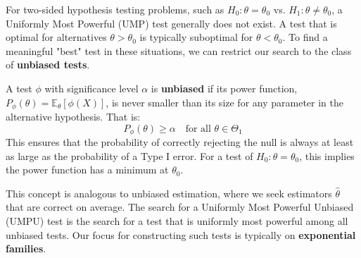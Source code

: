 For two-sided hypothesis testing problems, such as $H_0: \theta = \theta_0$ vs. $H_1: \theta \neq \theta_0$, a Uniformly Most Powerful (UMP) test generally does not exist. A test that is optimal for alternatives $\theta > \theta_0$ is typically suboptimal for $\theta < \theta_0$. To find a meaningful "best" test in these situations, we can restrict our search to the class of \textbf{unbiased tests}.

\begin{de}
A test $\phi$ with significance level $\alpha$ is \textbf{unbiased} if its power function, $P_{\phi}(\theta) = \mathbb{E}_{\theta}[\phi(X)]$, is never smaller than its size for any parameter in the alternative hypothesis. That is:
$$
P_{\phi}(\theta) \ge \alpha \quad \text{for all } \theta \in \Theta_1
$$
This ensures that the probability of correctly rejecting the null is always at least as large as the probability of a Type I error. For a test of $H_0: \theta = \theta_0$, this implies the power function has a minimum at $\theta_0$.
\end{de}

This concept is analogous to unbiased estimation, where we seek estimators $\hat{\theta}$ that are correct on average. The search for a Uniformly Most Powerful Unbiased (UMPU) test is the search for a test that is uniformly most powerful among all unbiased tests. Our focus for constructing such tests is typically on \textbf{exponential families}.

